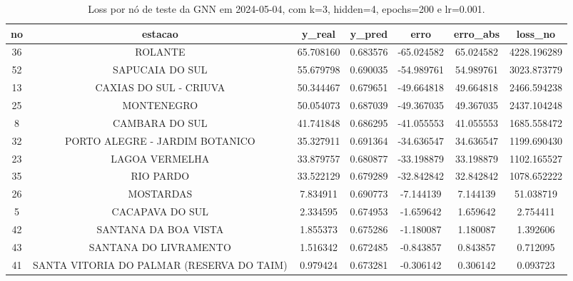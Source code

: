 \begin{table}[h]
\centering
\caption{Loss por nó de teste da GNN em 2024-05-04, com k=3, hidden=4, epochs=200 e lr=0.001.}
\label{tab:gnn_loss_nodes_k3_hidden4}
\begin{tabular}{ccccccc}
\toprule
no & estacao & y\_real & y\_pred & erro & erro\_abs & loss\_no \\
\midrule
36 & ROLANTE & 65.708160 & 0.683576 & -65.024582 & 65.024582 & 4228.196289 \\
52 & SAPUCAIA DO SUL & 55.679798 & 0.690035 & -54.989761 & 54.989761 & 3023.873779 \\
13 & CAXIAS DO SUL - CRIUVA & 50.344467 & 0.679651 & -49.664818 & 49.664818 & 2466.594238 \\
25 & MONTENEGRO & 50.054073 & 0.687039 & -49.367035 & 49.367035 & 2437.104248 \\
8 & CAMBARA DO SUL & 41.741848 & 0.686295 & -41.055553 & 41.055553 & 1685.558472 \\
32 & PORTO ALEGRE - JARDIM BOTANICO & 35.327911 & 0.691364 & -34.636547 & 34.636547 & 1199.690430 \\
23 & LAGOA VERMELHA & 33.879757 & 0.680877 & -33.198879 & 33.198879 & 1102.165527 \\
35 & RIO PARDO & 33.522129 & 0.679289 & -32.842842 & 32.842842 & 1078.652222 \\
26 & MOSTARDAS & 7.834911 & 0.690773 & -7.144139 & 7.144139 & 51.038719 \\
5 & CACAPAVA DO SUL & 2.334595 & 0.674953 & -1.659642 & 1.659642 & 2.754411 \\
42 & SANTANA DA BOA VISTA & 1.855373 & 0.675286 & -1.180087 & 1.180087 & 1.392606 \\
43 & SANTANA DO LIVRAMENTO & 1.516342 & 0.672485 & -0.843857 & 0.843857 & 0.712095 \\
41 & SANTA VITORIA DO PALMAR (RESERVA DO TAIM) & 0.979424 & 0.673281 & -0.306142 & 0.306142 & 0.093723 \\
\bottomrule
\end{tabular}
\end{table}
